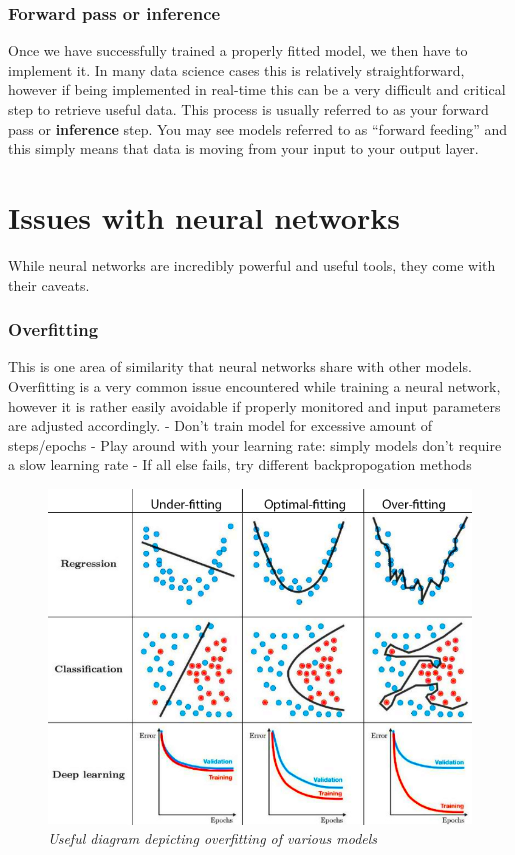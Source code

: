 \documentclass[
]{article}
\begin{document}
\hypertarget{forward-pass-or-inference}{%
\subsubsection{Forward pass or
inference}\label{forward-pass-or-inference}}

Once we have successfully trained a properly fitted model, we then have
to implement it. In many data science cases this is relatively
straightforward, however if being implemented in real-time this can be a
very difficult and critical step to retrieve useful data. This process
is usually referred to as your forward pass or \textbf{inference} step.
You may see models referred to as ``forward feeding'' and this simply
means that data is moving from your input to your output layer.

\hypertarget{issues-with-neural-networks}{%
\section{Issues with neural
networks}\label{issues-with-neural-networks}}

While neural networks are incredibly powerful and useful tools, they
come with their caveats.

\hypertarget{overfitting}{%
\subsubsection{Overfitting}\label{overfitting}}

This is one area of similarity that neural networks share with other
models. Overfitting is a very common issue encountered while training a
neural network, however it is rather easily avoidable if properly
monitored and input parameters are adjusted accordingly. - Don't train
model for excessive amount of steps/epochs - Play around with your
learning rate: simply models don't require a slow learning rate - If all
else fails, try different backpropogation methods

\begin{figure}
\centering
\includegraphics{media/overfittingDiagram.png}
\caption{\emph{Useful diagram depicting overfitting of various models}}
\end{figure}
\end{document}
